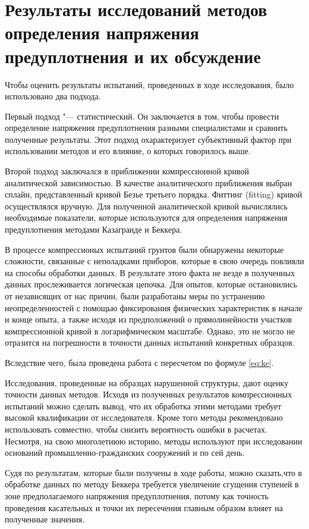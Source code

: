 \chapter{Результаты исследований методов определения напряжения предуплотнения и их обсуждение}

Чтобы оценить результаты испытаний, проведенных в ходе исследования, было использовано два подхода.

Первый подход "--- статистический. Он заключается в том, чтобы провести определение напряжения предуплотнения разными специалистами и сравнить полученные результаты. Этот подход охарактеризует субъективный фактор при использовании методов и его влияние, о которых говорилось выше.

Второй подход заключался в приближении компрессионной кривой аналитической зависимостью. В качестве аналитического приближения выбран сплайн, представленный кривой Безье третьего порядка. Фиттинг (fitting) кривой осуществлялся вручную. Для полученной аналитической кривой вычислялись необходимые показатели, которые используются для определения напряжения предуплотнения методами Казагранде и Беккера. 

В процессе компрессионых испытаний грунтов были обнаружены некоторые сложности, связанные с неполадками приборов, которые в свою очередь повлияли на способы обработки данных. В результате этого факта не везде в полученных данных прослеживается логическая цепочка. Для опытов, которые остановились от независящих от нас причин, были разработаны меры по устранению неопределенностей с помощью фиксирования физических характеристик в начале и конце опыта, а также исходя из предположений о прямолинейности участков компрессионной кривой в логарифмическом масштабе. Однако, это не могло не отразится на погрешности в точности данных испытаний конкретных образцов. 

Вследствие чего, была проведена работа с пересчетом по формуле \ref{eq:ke}.


Исследования, проведенные на образцах нарушенной структуры, дают оценку точности данных методов. Исходя из полученных результатов компрессионных испытаний можно сделать вывод, что их обработка этими методами требует высокой квалификации от исследователя. Кроме того методы рекомендовано использовать совместно, чтобы снизить вероятность ошибки в расчетах. Несмотря, на свою многолетнюю историю, методы используют при исследовании оснований промышленно-гражданских сооружений и по сей день. 

Судя по результатам, которые были получены в ходе работы, можно сказать,что в обработке данных по методу Беккера требуется увеличение сгущения ступеней в зоне предполагаемого напряжения предуплотнения, потому как точность проведения касательных и точки их пересечения главным образом влияет на полученные значения.

